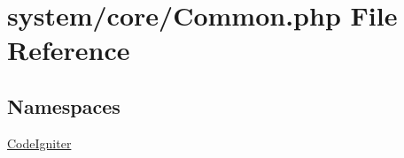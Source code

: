 \hypertarget{_common_8php}{}\section{system/core/\+Common.php File Reference}
\label{_common_8php}
\subsection*{Namespaces}
\begin{DoxyCompactItemize}
\item 
 \mbox{\hyperlink{namespace_code_igniter}{Code\+Igniter}}
\end{DoxyCompactItemize}
